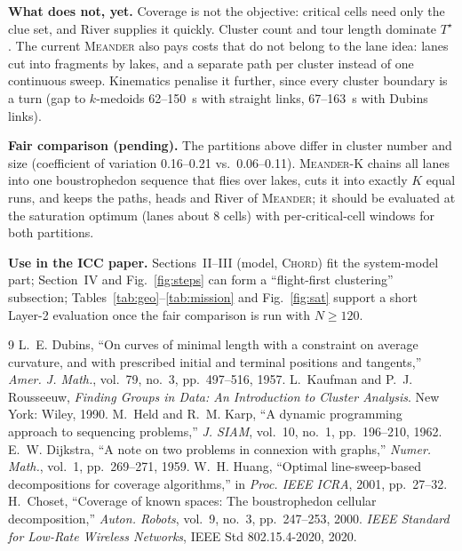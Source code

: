 \documentclass[conference]{IEEEtran}
\begin{document}
\textbf{What does not, yet.} Coverage is not the objective: critical cells need only the clue set, and River supplies
it quickly. Cluster count and tour length dominate $T^\star$. The current \textsc{Meander} also pays costs that do not
belong to the lane idea: lanes cut into fragments by lakes, and a separate path per cluster instead of one continuous
sweep. Kinematics penalise it further, since every cluster boundary is a turn (gap to $k$-medoids
62--\SI{150}{s} with straight links, 67--\SI{163}{s} with Dubins links).

\textbf{Fair comparison (pending).} The partitions above differ in cluster number and size (coefficient of variation
0.16--0.21 vs.\ 0.06--0.11). \textsc{Meander-K} chains all lanes into one boustrophedon sequence that flies over
lakes, cuts it into exactly $K$ equal runs, and keeps the paths, heads and River of \textsc{Meander}; it should be
evaluated at the saturation optimum (lanes about 8 cells) with per-critical-cell windows for both partitions.

\textbf{Use in the ICC paper.} Sections~II--III (model, \textsc{Chord}) fit the system-model part; Section~IV and
Fig.~\ref{fig:steps} can form a ``flight-first clustering'' subsection; Tables~\ref{tab:geo}--\ref{tab:mission} and
Fig.~\ref{fig:sat} support a short Layer-2 evaluation once the fair comparison is run with $N\ge120$.


\begin{thebibliography}{9}
 L.~E. Dubins, ``On curves of minimal length with a constraint on average curvature, and with
prescribed initial and terminal positions and tangents,'' \emph{Amer. J. Math.}, vol.~79, no.~3, pp.~497--516, 1957.
 L.~Kaufman and P.~J. Rousseeuw, \emph{Finding Groups in Data: An Introduction to Cluster
Analysis}. New York: Wiley, 1990.
 M.~Held and R.~M. Karp, ``A dynamic programming approach to sequencing problems,'' \emph{J. SIAM},
vol.~10, no.~1, pp.~196--210, 1962.
 E.~W. Dijkstra, ``A note on two problems in connexion with graphs,'' \emph{Numer. Math.},
vol.~1, pp.~269--271, 1959.
 W.~H. Huang, ``Optimal line-sweep-based decompositions for coverage algorithms,'' in \emph{Proc.
IEEE ICRA}, 2001, pp.~27--32.
 H.~Choset, ``Coverage of known spaces: The boustrophedon cellular decomposition,''
\emph{Auton. Robots}, vol.~9, no.~3, pp.~247--253, 2000.
 \emph{IEEE Standard for Low-Rate Wireless Networks}, IEEE Std 802.15.4-2020, 2020.
\end{thebibliography}
\end{document}

